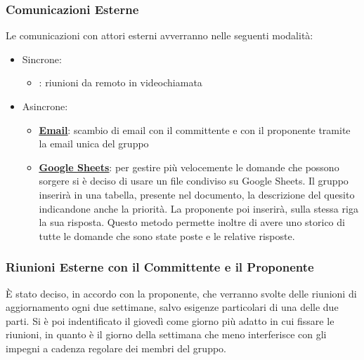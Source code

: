 \documentclass[a4paper,12pt]{article}
\begin{document}


\subsubsection{Comunicazioni Esterne}
Le comunicazioni con attori esterni avverranno nelle seguenti modalità:
\begin{itemize}
    \item Sincrone:
        \begin{itemize}
            \item \textbf{\underline{}}: riunioni da remoto in videochiamata 
        \end{itemize}
    \item Asincrone:
        \begin{itemize}
            \item \textbf{\underline{\hyperref[strumenti:gmail]{Email}}}: scambio di email con il committente e con il proponente tramite la email unica del gruppo
            \item \textbf{\underline{\hyperref[strumenti:googleSheets]{Google Sheets}}}: per gestire più velocemente le domande che possono sorgere si è deciso di usare un file condiviso su Google Sheets. 
                Il gruppo inserirà in una tabella, presente nel documento, la descrizione del quesito indicandone anche la priorità.
                La proponente poi inserirà, sulla stessa riga la sua risposta. 
                Questo metodo permette inoltre di avere uno storico di tutte le domande che sono state poste e le relative risposte.
        \end{itemize}
\end{itemize}

\subsubsection{Riunioni Esterne con il Committente e il Proponente}
È stato deciso, in accordo con la proponente, che verranno svolte delle riunioni di aggiornamento ogni due settimane, salvo esigenze particolari di una delle due parti.
Si è poi indentificato il giovedì come giorno più adatto in cui fissare le riunioni, in quanto è il giorno della settimana che meno interferisce con gli impegni a cadenza regolare dei membri del gruppo.
\end{document}
